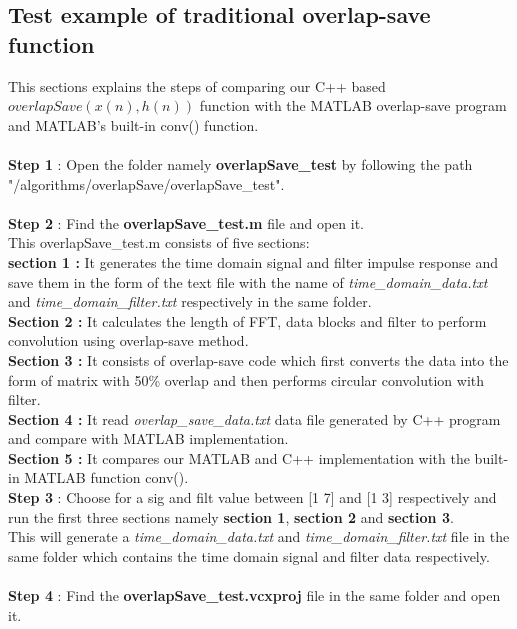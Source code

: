 \begin{refsection}
\subsection*{Test example of traditional overlap-save function}
This sections explains the steps of comparing our C++ based $overlapSave(x(n), h(n))$ function with the MATLAB overlap-save program and MATLAB's built-in conv() function.\\ \\
\textbf{Step 1} : Open the folder namely \textbf{overlapSave\_test} by following the path "/algorithms/overlapSave/overlapSave\_test".\\ \\
\textbf{Step 2} : Find the \textbf{overlapSave\_test.m} file and open it.\\
This overlapSave\_test.m consists of five sections:\\
\textbf{section 1 :} It generates the time domain signal and filter impulse response  and save them in the form of the text file with the name of \textit{time\_domain\_data.txt} and \textit{time\_domain\_filter.txt} respectively in the same folder.\\
\textbf{Section 2 :} It calculates the length of FFT, data blocks and filter to perform convolution using overlap-save method.\\
\textbf{Section 3 :} It consists of overlap-save code which first converts the data into the form of matrix with 50\% overlap and then performs circular convolution with filter.\\
\textbf{Section 4 :} It read \textit{overlap\_save\_data.txt} data file generated by C++ program and compare with MATLAB implementation. \\
\textbf{Section 5 :} It compares our MATLAB and C++ implementation with the built-in MATLAB function conv(). \\

\textbf{Step 3} : Choose for a sig and filt value between [1 7] and [1 3] respectively and run the first three sections namely \textbf{section 1}, \textbf{section 2} and \textbf{section 3}.\\
This will generate a \textit{time\_domain\_data.txt} and \textit{time\_domain\_filter.txt} file in the same folder which contains the time domain signal and filter data respectively.\\ \\
\textbf{Step 4} : Find the \textbf{overlapSave\_test.vcxproj} file in the same folder and open it.\\

\end{refsection}
